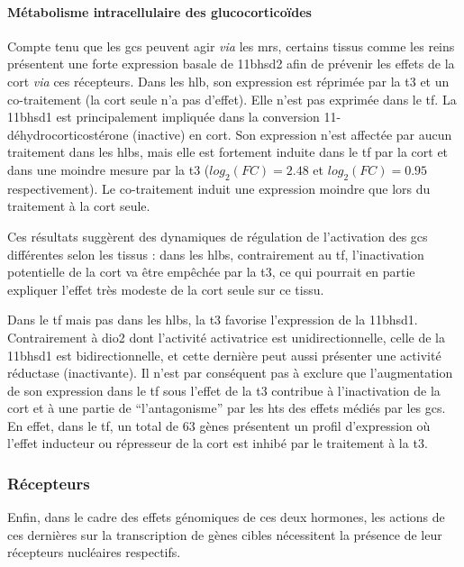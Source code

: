 \documentclass[../main.tex]{subfiles}
\begin{document}
			\paragraph{Métabolisme intracellulaire des glucocorticoïdes}
				Compte tenu que les \glspl{gc} peuvent agir \textit{via} les \glspl{mr}, certains tissus comme les reins présentent une forte expression basale de \gls{11bhsd2} afin de prévenir les effets de la \gls{cort} \textit{via} ces récepteurs.
				Dans les \gls{hlb}, son expression est réprimée par la \gls{t3} et un co-traitement (la \gls{cort} seule n'a pas d'effet).
				Elle n'est pas exprimée dans le \gls{tf}.
				La \gls{11bhsd1} est principalement impliquée dans la conversion 11-déhydrocorticostérone (inactive) en \gls{cort}.
				Son expression n'est affectée par aucun traitement dans les \glspl{hlb}, mais elle est fortement induite dans le \gls{tf} par la \gls{cort} et dans une moindre mesure par la \gls{t3} ($log_2(FC)=2.48$ et $log_2(FC)=0.95$ respectivement).
				Le co-traitement induit une expression moindre que lors du traitement à la \gls{cort} seule.
				\par
				Ces résultats suggèrent des dynamiques de régulation de l'activation des \glspl{gc} différentes selon les tissus :
				dans les \glspl{hlb}, contrairement au \gls{tf}, l'inactivation potentielle de la \gls{cort} va être empêchée par la \gls{t3}, ce qui pourrait en partie expliquer l'effet très modeste de la \gls{cort} seule sur ce tissu.
				\par
				Dans le \gls{tf} mais pas dans les \glspl{hlb}, la \gls{t3} favorise l'expression de la \gls{11bhsd1}.
				Contrairement à \gls{dio2} dont l'activité activatrice est unidirectionnelle, celle de la \gls{11bhsd1} est bidirectionnelle, et cette dernière peut aussi présenter une activité réductase (inactivante).
				Il n'est par conséquent pas à exclure que l'augmentation de son expression dans le \gls{tf} sous l'effet de la \gls{t3} contribue à l'inactivation de la \gls{cort} et à une partie de ``l'antagonisme'' par les \glspl{ht} des effets médiés par les \glspl{gc}.
				En effet, dans le \gls{tf}, un total de 63 gènes présentent un profil d'expression où l'effet inducteur ou répresseur de la \gls{cort} est inhibé par le traitement à la \gls{t3}.

		\subsubsection{Récepteurs}
			Enfin, dans le cadre des effets génomiques de ces deux hormones, les actions de ces dernières sur la transcription de gènes cibles nécessitent la présence de leur récepteurs nucléaires respectifs.
\end{document}
